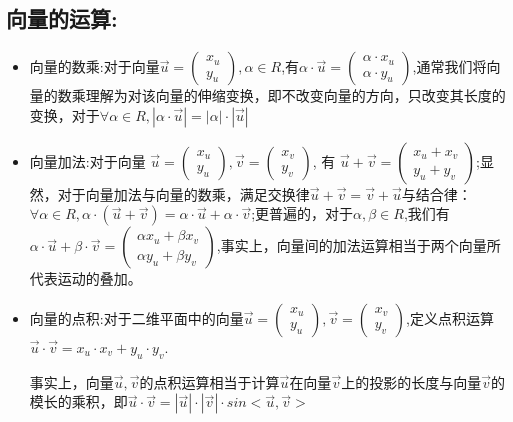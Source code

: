\documentclass[UTF8]{article}
\begin{document}
\subsection{向量的运算:}

\begin{itemize}
	\item 向量的数乘:对于向量$\vec{u} = \left(
\begin{array}{l}
x_u\\
y_u
\end{array}
\right), \alpha \in R$,有$\alpha\cdot\vec{u} = \left(
\begin{array}{l}
\alpha\cdot x_u\\
\alpha\cdot y_u
\end{array}
\right)$,通常我们将向量的数乘理解为对该向量的伸缩变换，即不改变向量的方向，只改变其长度的变换，对于$\forall \alpha\in R, |\alpha\cdot \vec{u}| = |\alpha|\cdot |\vec{u}|$

	\item 向量加法:对于向量
$\vec{u}= 
\left(
\begin{array}{l}
x_u\\
y_u
\end{array}
\right), 
\vec{v}= 
\left(
\begin{array}{l}
x_v\\
y_v
\end{array}
\right)$, 有
$\vec{u} + \vec{v} = 
\left(
\begin{array}{l}
x_u + x_v\\
y_u + y_v
\end{array}
\right)$;显然，对于向量加法与向量的数乘，满足交换律$\vec{u} + \vec{v} = \vec{v} + \vec{u}$与结合律：$\forall \alpha \in R, \alpha \cdot (\vec{u}+ \vec{v}) = \alpha\cdot\vec{u} + \alpha\cdot\vec{v}$;更普遍的，对于$\alpha, \beta \in R$,我们有$\alpha \cdot \vec{u} + \beta \cdot \vec{v} = 
\left(
\begin{array}{l}
\alpha x_u + \beta x_v\\
\alpha y_u + \beta y_v
\end{array}
\right)$,事实上，向量间的加法运算相当于两个向量所代表运动的叠加。

	\item 向量的点积:对于二维平面中的向量$\vec{u} = \left(
\begin{array}{l}
x_u\\
y_u
\end{array}
\right), \vec{v} = \left(
\begin{array}{l}
x_v\\
y_v
\end{array}
\right)$,定义点积运算$\vec{u}\cdot\vec{v} = x_u\cdot x_v + y_u\cdot y_v$.

事实上，向量$\vec{u}, \vec{v}$的点积运算相当于计算$\vec{u}$在向量$\vec{v}$上的投影的长度与向量$\vec{v}$的模长的乘积，即$\vec{u}\cdot\vec{v} = |\vec{u}|\cdot|\vec{v}|\cdot sin<\vec{u}, \vec{v}>$
\end{itemize}
\end{document}
